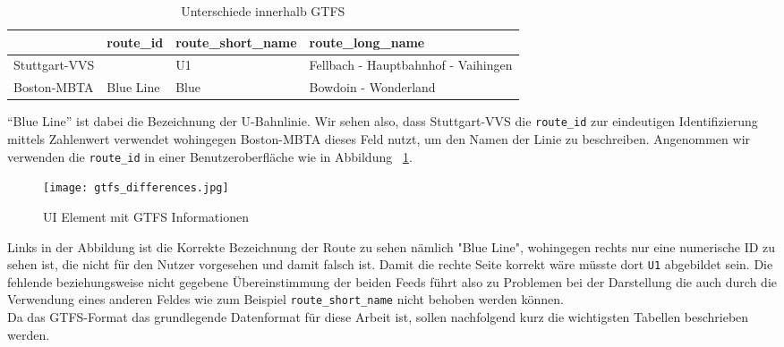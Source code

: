 \begin{newpage}
    \begin{longtable}{|>{\raggedright \arraybackslash}p{3.0cm}|>{\raggedright \arraybackslash}p{2.0cm}|>{\raggedright \arraybackslash}p{3.5cm}|>{\raggedright \arraybackslash}p{5.5cm}|}
    \caption{Unterschiede innerhalb GTFS} 
    \label{table:gtfs_differences}\\
      \hline
       & route\_id & route\_short\_name & route\_long\_name\\
      \hline
      Stuttgart-VVS & 379 & U1 & Fellbach - Hauptbahnhof - Vaihingen\\
      \hline
      Boston-MBTA & Blue Line & Blue & Bowdoin - Wonderland\\
      \hline
    \end{longtable}


    "`Blue Line"' ist dabei die Bezeichnung der U-Bahnlinie\parencite{wiki_blue_line}. Wir sehen also, dass Stuttgart-VVS die \texttt{route\_id} zur eindeutigen Identifizierung mittels Zahlenwert verwendet wohingegen Boston-MBTA dieses Feld nutzt, um den Namen der Linie zu beschreiben. Angenommen wir verwenden die \texttt{route\_id} in einer Benutzeroberfläche wie in Abbildung ~\ref{fig:gtfs_differences}.

    \begin{figure}[htbp]
      \begin{center}
        \texttt{[image: gtfs\_differences.jpg]}
        \caption{UI Element mit GTFS Informationen}
        \label{fig:gtfs_differences}
      \end{center}
    \end{figure}

    Links in der Abbildung ist die Korrekte Bezeichnung der Route zu sehen nämlich "Blue Line", wohingegen rechts nur eine numerische ID zu sehen ist, die nicht für den Nutzer vorgesehen und damit falsch ist. Damit die rechte Seite korrekt wäre müsste dort \texttt{U1} abgebildet sein. Die fehlende beziehungsweise nicht gegebene Übereinstimmung der beiden Feeds führt also zu Problemen bei der Darstellung die auch durch die Verwendung eines anderen Feldes wie zum Beispiel \texttt{route\_short\_name} nicht behoben werden können.\\

		Da das GTFS-Format das grundlegende Datenformat für diese Arbeit ist, sollen nachfolgend kurz die wichtigsten Tabellen beschrieben werden.


\end{newpage}
